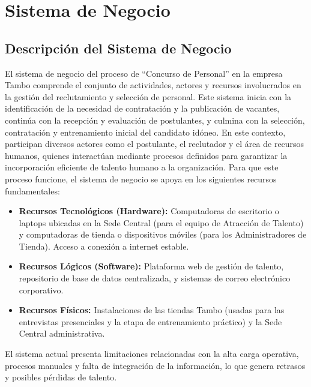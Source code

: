 \chapter{Sistema de Negocio}
\section{Descripción del Sistema de Negocio}
El sistema de negocio del proceso de “Concurso de Personal” en la empresa Tambo comprende el conjunto de actividades, actores y recursos involucrados en la gestión del reclutamiento y selección de personal. Este sistema inicia con la identificación de la necesidad de contratación y la publicación de vacantes, continúa con la recepción y evaluación de postulantes, y culmina con la selección, contratación y entrenamiento inicial del candidato idóneo.
En este contexto, participan diversos actores como el postulante, el reclutador y el área de recursos humanos, quienes interactúan mediante procesos definidos para garantizar la incorporación eficiente de talento humano a la organización.
Para que este proceso funcione, el sistema de negocio se apoya en los siguientes recursos fundamentales:
\begin{itemize}
    \item \textbf{Recursos Tecnológicos (Hardware):} Computadoras de escritorio o laptops ubicadas en la Sede Central (para el equipo de Atracción de Talento) y computadoras de tienda o dispositivos móviles (para los Administradores de Tienda). Acceso a conexión a internet estable.
    \item \textbf{Recursos Lógicos (Software):} Plataforma web de gestión de talento, repositorio de base de datos centralizada, y sistemas de correo electrónico corporativo.
    \item \textbf{Recursos Físicos:} Instalaciones de las tiendas Tambo (usadas para las entrevistas presenciales y la etapa de entrenamiento práctico) y la Sede Central administrativa.
\end{itemize}

El sistema actual presenta limitaciones relacionadas con la alta carga operativa, procesos manuales y falta de integración de la información, lo que genera retrasos y posibles pérdidas de talento.